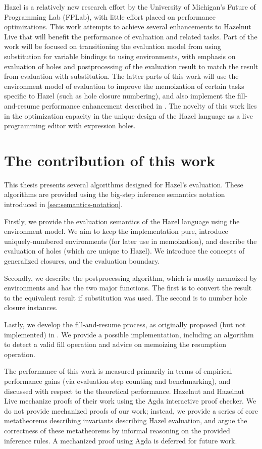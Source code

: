 Hazel is a relatively new research effort by the University of Michigan's Future of Programming Lab (FPLab), with little effort placed on performance optimizations. This work attempts to achieve several enhancements to Hazelnut Live that will benefit the performance of evaluation and related tasks. Part of the work will be focused on transitioning the evaluation model from using substitution for variable bindings to using environments, with emphasis on evaluation of holes and postprocessing of the evaluation result to match the result from evaluation with substitution. The latter parts of this work will use the environment model of evaluation to improve the memoization of certain tasks specific to Hazel (such as hole closure numbering), and also implement the fill-and-resume performance enhancement described in \cite{conf/popl/HazelnutLive19}. The novelty of this work lies in the optimization capacity in the unique design of the Hazel language as a live programming editor with expression holes.

\section{The contribution of this work}
\label{sec:contribution}

This thesis presents several algorithms designed for Hazel's evaluation. These algorithms are provided using the big-step inference semantics notation introduced in \cref{sec:semantics-notation}.

Firstly, we provide the evaluation semantics of the Hazel language using the environment model. We aim to keep the implementation pure, introduce uniquely-numbered environments (for later use in memoization), and describe the evaluation of holes (which are unique to Hazel). We introduce the concepts of generalized closures, and the evaluation boundary.

Secondly, we describe the postprocessing algorithm, which is mostly memoized by environments and has the two major functions. The first is to convert the result to the equivalent result if substitution was used. The second is to number hole closure instances.

Lastly, we develop the fill-and-resume process, as originally proposed (but not implemented) in \cite{conf/popl/HazelnutLive19}. We provide a possible implementation, including an algorithm to detect a valid fill operation and advice on memoizing the resumption operation.

The performance of this work is measured primarily in terms of empirical performance gains (via evaluation-step counting and benchmarking), and discussed with respect to the theoretical performance. Hazelnut \cite{conf/popl/Hazelnut17} and Hazelnut Live \cite{conf/popl/HazelnutLive19} mechanize proofs of their work using the Agda interactive proof checker. We do not provide mechanized proofs of our work; instead, we provide a series of core metatheorems describing invariants describing Hazel evaluation, and argue the correctness of these metatheorems by informal reasoning on the provided inference rules. A mechanized proof using Agda is deferred for future work.

